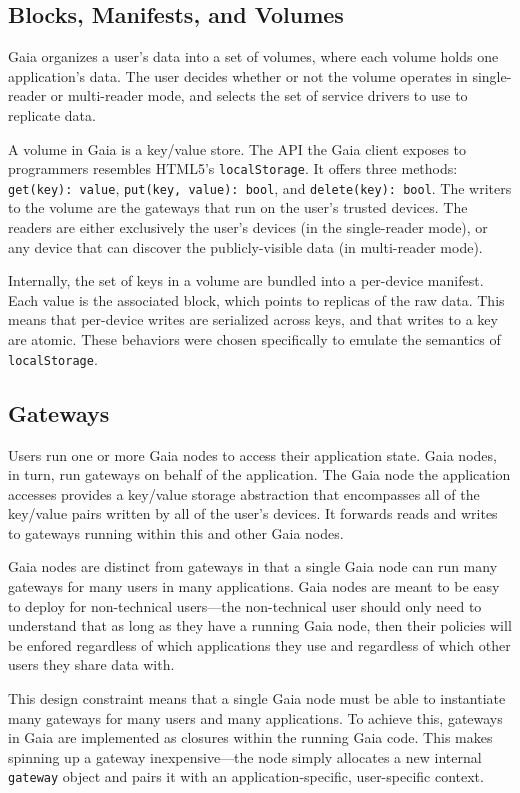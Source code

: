 \subsection{Blocks, Manifests, and Volumes}

Gaia organizes a user's data into a set of volumes, where each volume
holds one application's data.  The user decides whether or not the volume
operates in single-reader or multi-reader mode, and selects the set of
service drivers to use to replicate data.

A volume in Gaia is a key/value store.  The API the Gaia client exposes to
programmers resembles HTML5's \texttt{localStorage}.  It offers three methods:
\texttt{get(key): value}, \texttt{put(key, value): bool}, and
\texttt{delete(key): bool}.  The writers to the volume are the gateways that run
on the user's trusted devices.  The readers are either exclusively the user's
devices (in the single-reader mode), or any device that can discover the
publicly-visible data (in multi-reader mode).

Internally, the set of keys in a volume are bundled into a per-device manifest.
Each value is the associated block, which points to replicas of the raw data.
This means that per-device writes are serialized
across keys, and that writes to a key are atomic.  These behaviors were chosen
specifically to emulate the semantics of \texttt{localStorage}.

\subsection{Gateways}

Users run one or more Gaia nodes to access their application state.  Gaia nodes,
in turn, run gateways on behalf of the application.  The Gaia node the
application accesses provides a key/value storage abstraction that encompasses
all of the key/value pairs written by all of the user's devices.  It forwards
reads and writes to gateways running within this and other Gaia nodes.

Gaia nodes are distinct from gateways in that a single Gaia node can run many
gateways for many users in many applications.  Gaia nodes are meant to be easy
to deploy for non-technical users---the non-technical user should only need to
understand that as long as they have a running Gaia node, then their policies
will be enfored regardless of which applications they use and regardless of
which other users they share data with.

This design constraint means that a
single Gaia node must be able to instantiate many gateways for many users
and many applications.  To achieve this, gateways in Gaia are implemented as
closures within the running Gaia code.  This makes spinning up a gateway
inexpensive---the node simply allocates a new internal \texttt{gateway} object
and pairs it with an application-specific, user-specific context.

